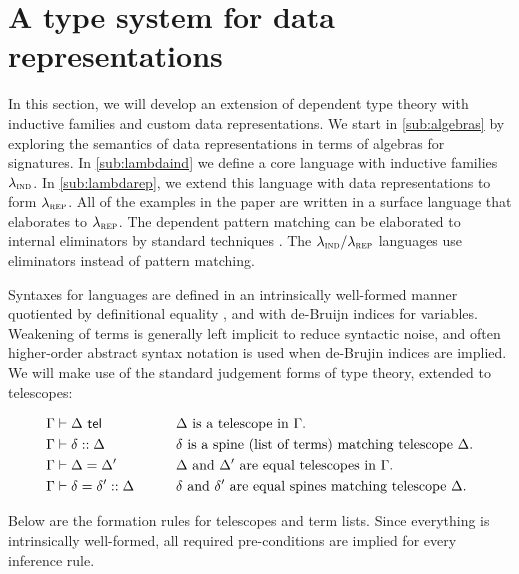 \section{A type system for data representations}\label{sec:type-system}


In this section, we will develop an extension of dependent type theory with
inductive families and custom data representations. We start in
\cref{sub:algebras} by exploring the semantics of data representations in terms
of algebras for signatures. In \cref{sub:lambdaind}
we define a core language with inductive families $\lambda_{\textsc{ind}}$. In
\cref{sub:lambdarep}, we extend this language with data representations to form
$\lambda_{\textsc{rep}}$. All of the examples in the paper are written in a surface language
that elaborates to $\lambda_{\textsc{rep}}$. The dependent pattern matching can be
elaborated to internal eliminators by standard techniques
\cite{Goguen2006-sy,Cockx2018-fk}. The $\lambda_{\textsc{ind}}/\lambda_{\textsc{rep}}$ languages use eliminators instead
of pattern matching. 

Syntaxes for languages are defined in an intrinsically well-formed manner
quotiented by definitional equality \cite{Altenkirch2016-zc}, and with de-Bruijn
indices for variables. Weakening of terms is generally left implicit to reduce
syntactic noise, and often higher-order abstract syntax notation is used when
de-Brujin indices are implied. We will make use of the standard judgement forms
of type theory, extended to telescopes:

\begin{alignat*}{2}
&\Gamma \vdash \Delta \ \textsf{tel}                && \qquad \text{$\Delta$ is a telescope in $\Gamma$.} \\
&\Gamma \vdash \delta :: \Delta           && \qquad \text{$\delta$ is a spine (list of terms) matching telescope $\Delta$.} \\
&\Gamma \vdash \Delta = \Delta'           && \qquad \text{$\Delta$ and $\Delta'$ are equal telescopes in $\Gamma$.} \\
&\Gamma \vdash \delta = \delta' :: \Delta && \qquad \text{$\delta$ and $\delta'$ are equal spines matching telescope $\Delta$.}
\end{alignat*}

Below are the formation rules for telescopes and term lists.
Since everything is intrinsically well-formed, all required pre-conditions are
implied for every inference rule.

